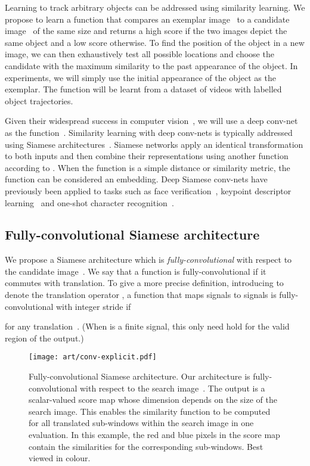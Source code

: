Learning to track arbitrary objects can be addressed using similarity learning.
We propose to learn a function  that compares an exemplar image~ to a candidate image~ of the same size and returns a high score if the two images depict the same object and a low score otherwise.
To find the position of the object in a new image, we can then exhaustively test all possible locations and choose the candidate with the maximum similarity to the past appearance of the object.
In experiments, we will simply use the initial appearance of the object as the exemplar.
The function  will be learnt from a dataset of videos with labelled object trajectories.

Given their widespread success in computer vision~\cite{razavian2014cnn,parkhi2015deep,dosovitskiy2015flownet,krizhevsky2012imagenet}, we will use a deep conv-net as the function~.
Similarity learning with deep conv-nets is typically addressed using Siamese architectures~\cite{bromley1993signature,taigman2014deepface,zagoruyko2015learning}.
Siamese networks apply an identical transformation  to both inputs and then combine their representations using another function  according to .
When the function  is a simple distance or similarity metric, the function  can be considered an embedding.
Deep Siamese conv-nets have previously been applied to tasks such as face verification~\cite{taigman2014deepface,schroff2015facenet,parkhi2015deep}, keypoint descriptor learning~\cite{zagoruyko2015learning,simo2015discriminative} and one-shot character recognition~\cite{koch2015siamese}.

\subsection{Fully-convolutional Siamese architecture}

We propose a Siamese architecture which is \emph{fully-convolutional} with respect to the candidate image~.
We say that a function is fully-convolutional if it commutes with translation.
To give a more precise definition, introducing  to denote the translation operator , a function  that maps signals to signals is fully-convolutional with integer stride  if

for any translation~.
(When  is a finite signal, this only need hold for the valid region of the output.)

\begin{figure}[t]
\centering
\texttt{[image: art/conv-explicit.pdf]}
\caption{Fully-convolutional Siamese architecture.
Our architecture is fully-convolutional with respect to the search image~.
The output is a scalar-valued score map whose dimension depends on the size of the search image.
This enables the similarity function to be computed for all translated sub-windows within the search image in one evaluation.
In this example, the red and blue pixels in the score map contain the similarities for the corresponding sub-windows.
Best viewed in colour.
}
\label{fig:fully-conv-siamese}
\end{figure}


